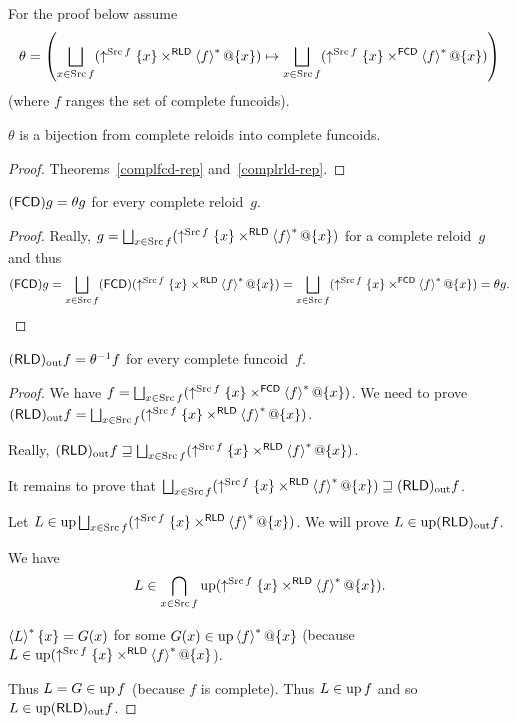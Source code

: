 For the proof below assume 
\[
\theta=\left(\bigsqcup_{x\in\Src f}(\uparrow^{\Src f}\{x\}\times^{\mathsf{RLD}}\rsupfun f@\{x\})\mapsto\bigsqcup_{x\in\Src f}(\uparrow^{\Src f}\{x\}\times^{\mathsf{FCD}}\rsupfun f@\{x\})\right)
\]
 (where $f$ ranges the set of complete funcoids).
\begin{lem}
$\theta$ is a bijection from complete reloids into complete funcoids.\end{lem}
\begin{proof}
Theorems~\ref{complfcd-rep} and~\ref{complrld-rep}.\end{proof}
\begin{lem}
$(\mathsf{FCD}) g=\theta g$ for every complete reloid~$g$.\end{lem}
\begin{proof}
Really, $g=\bigsqcup_{x\in\Src f}(\uparrow^{\Src f}\{x\}\times^{\mathsf{RLD}}\rsupfun f@\{x\})$
for a complete reloid~$g$ and thus 
\[
\tofcd g=\bigsqcup_{x\in\Src f}\tofcd(\uparrow^{\Src f}\{x\}\times^{\mathsf{RLD}}\rsupfun f@\{x\})=\bigsqcup_{x\in\Src f}(\uparrow^{\Src f}\{x\}\times^{\mathsf{FCD}}\rsupfun f@\{x\})=\theta g.
\]
\end{proof}
\begin{lem}
$(\mathsf{RLD})_{\mathrm{out}} f=\theta^{-1}f$ for every complete funcoid~$f$.\end{lem}
\begin{proof}
We have $f=\bigsqcup_{x\in\Src f}(\uparrow^{\Src f}\{x\}\times^{\mathsf{FCD}}\rsupfun f@\{x\})$.
We need to prove $\torldout f=\bigsqcup_{x\in\Src f}(\uparrow^{\Src f}\{x\}\times^{\mathsf{RLD}}\rsupfun f@\{x\})$.

Really, $\torldout f\sqsupseteq\bigsqcup_{x\in\Src f}(\uparrow^{\Src f}\{x\}\times^{\mathsf{RLD}}\rsupfun f@\{x\})$.

It remains to prove that $\bigsqcup_{x\in\Src f}(\uparrow^{\Src f}\{x\}\times^{\mathsf{RLD}}\rsupfun f@\{x\})\sqsupseteq\torldout f$.

Let $L\in\up\bigsqcup_{x\in\Src f}(\uparrow^{\Src f}\{x\}\times^{\mathsf{RLD}}\rsupfun f@\{x\})$.
We will prove $L\in\operatorname{up}(\mathsf{RLD})_{\mathrm{out}} f$.

We have 
\[
L\in\bigcap_{x\in\operatorname{Src} f}\operatorname{up}(\uparrow^{\operatorname{Src} f}\{x\}\times^{\mathsf{RLD}}\left\langle f\right\rangle ^{\ast}@\{x\}).
\]

$\left\langle L\right\rangle ^{\ast}\{x\} = G(x)$ for some $G(x)\in\operatorname{up}\left\langle f\right\rangle ^{\ast}@\{x\}$ (because
$L\in\operatorname{up}(\uparrow^{\operatorname{Src} f}\{x\}\times^{\mathsf{RLD}}\left\langle f\right\rangle ^{\ast}@\{x\}$).

Thus $L=G\in\operatorname{up} f$ (because $f$ is complete). Thus $L\in\operatorname{up} f$ and so $L\in\operatorname{up}(\mathsf{RLD})_{\mathrm{out}} f$.

\end{proof}
